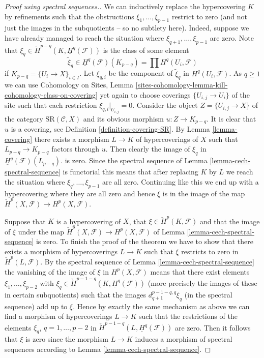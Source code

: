 \begin{proof}[Proof using spectral sequences.]
\medskip\noindent
We can inductively replace the hypercovering $K$ by refinements
such that the obstructions $\xi_1, \ldots, \xi_{p - 1}$ restrict to zero
(and not just the images
in the subquotients -- so no subtlety here). Indeed, suppose we have
already managed to reach the situation where
$\xi_{q + 1}, \ldots, \xi_{p - 1}$ are zero.
Note that $\xi_q \in \check{H}^{p - q}(K, \underline{H}^q(\mathcal{F}))$
is the class of some element
$$
\tilde \xi_q \in
\underline{H}^q(\mathcal{F})(K_{p - q}) =
\prod H^q(U_i, \mathcal{F})
$$
if $K_{p - q} = \{U_i \to X\}_{i \in I}$. Let $\xi_{q, i}$
be the component of $\tilde \xi_q$ in $H^q(U_i, \mathcal{F})$.
As $q \geq 1$ we can use
Cohomology on Sites,
Lemma \ref{sites-cohomology-lemma-kill-cohomology-class-on-covering}
yet again to choose coverings $\{U_{i, j} \to U_i\}$
of the site such that each restriction $\xi_{q, i}|_{U_{i, j}} = 0$.
Consider the object $Z = \{U_{i, j} \to X\}$ of the category
$\text{SR}(\mathcal{C}, X)$ and its obvious morphism
$u : Z \to K_{p - q}$. It is clear that $u$ is a covering, see
Definition \ref{definition-covering-SR}. By
Lemma \ref{lemma-covering} there
exists a morphism $L \to K$ of hypercoverings of $X$ such that
$L_{p - q} \to K_{p - q}$ factors through $u$. Then clearly the
image of $\xi_q$ in $\underline{H}^q(\mathcal{F})(L_{p - q})$.
is zero. Since the spectral sequence of
Lemma \ref{lemma-cech-spectral-sequence}
is functorial this means that after replacing $K$ by $L$ we reach the
situation where $\xi_q, \ldots, \xi_{p - 1}$ are all zero.
Continuing like this we end up with a hypercovering where they are all
zero and hence $\xi$ is in the image of the map
$\check{H}^p(X, \mathcal{F}) \to H^p(X, \mathcal{F})$.

\medskip\noindent
Suppose that $K$ is a hypercovering of $X$, that
$\xi \in \check{H}^p(K, \mathcal{F})$ and that the image of
$\xi$ under the map
$\check{H}^p(X, \mathcal{F}) \to H^p(X, \mathcal{F})$ of
Lemma \ref{lemma-cech-spectral-sequence}
is zero. To finish the proof of the theorem we have to show that
there exists a morphism of hypercoverings $L \to K$ such that
$\xi$ restricts to zero in $\check{H}^p(L, \mathcal{F})$.
By the spectral sequence of Lemma \ref{lemma-cech-spectral-sequence}
the vanishing of the image of $\xi$ in $H^p(X, \mathcal{F})$
means that there exist elements $\xi_1, \ldots, \xi_{p - 2}$
with $\xi_q \in \check{H}^{p - 1 - q}(K, \underline{H}^q(\mathcal{F}))$
(more precisely the images of these in certain subquotients)
such that the images $d_{q + 1}^{p - 1 - q, q}\xi_q$ (in the spectral
sequence) add up to $\xi$. Hence by exactly the same mechanism as above
we can find a morphism of hypercoverings $L \to K$ such that
the restrictions of the elements $\xi_q$, $q = 1, \ldots, p - 2$
in $\check{H}^{p - 1 - q}(L, \underline{H}^q(\mathcal{F}))$ are zero.
Then it follows that $\xi$ is zero since the morphism $L \to K$
induces a morphism of spectral sequences according to
Lemma \ref{lemma-cech-spectral-sequence}.
\end{proof}


